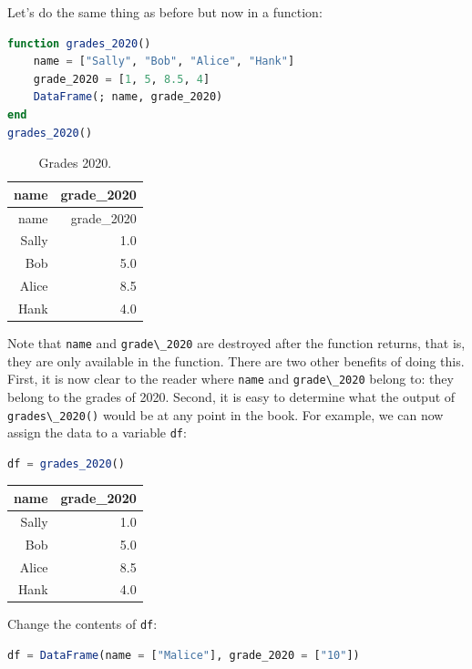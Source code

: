 \documentclass[
  notoc %
]{tufte-book}
\newcommand{\passthrough}[1]{#1}
\begin{document}
Let's do the same thing as before but now in a function:

\begin{lstlisting}[language=Julia]
function grades_2020()
    name = ["Sally", "Bob", "Alice", "Hank"]
    grade_2020 = [1, 5, 8.5, 4]
    DataFrame(; name, grade_2020)
end
grades_2020()
\end{lstlisting}

\hypertarget{tbl:grades_2020}{}
\begin{longtable}[]{@{}rr@{}}
\caption{\label{tbl:grades_2020}Grades 2020.}\tabularnewline
\toprule
name & grade\_2020 \\
\midrule
\endfirsthead
\toprule
name & grade\_2020 \\
\midrule
\endhead
Sally & 1.0 \\
Bob & 5.0 \\
Alice & 8.5 \\
Hank & 4.0 \\
\bottomrule
\end{longtable}

Note that \passthrough{\lstinline!name!} and
\passthrough{\lstinline!grade\_2020!} are destroyed after the function
returns, that is, they are only available in the function. There are two
other benefits of doing this. First, it is now clear to the reader where
\passthrough{\lstinline!name!} and \passthrough{\lstinline!grade\_2020!}
belong to: they belong to the grades of 2020. Second, it is easy to
determine what the output of \passthrough{\lstinline!grades\_2020()!}
would be at any point in the book. For example, we can now assign the
data to a variable \passthrough{\lstinline!df!}:

\begin{lstlisting}[language=Julia]
df = grades_2020()
\end{lstlisting}

\begin{longtable}[]{@{}rr@{}}
\toprule
name & grade\_2020 \\
\midrule
\endhead
Sally & 1.0 \\
Bob & 5.0 \\
Alice & 8.5 \\
Hank & 4.0 \\
\bottomrule
\end{longtable}

Change the contents of \passthrough{\lstinline!df!}:

\begin{lstlisting}[language=Julia]
df = DataFrame(name = ["Malice"], grade_2020 = ["10"])
\end{lstlisting}
\end{document}
